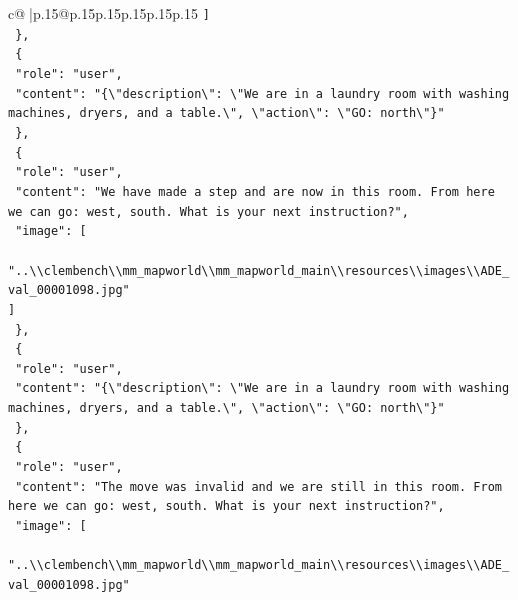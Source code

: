 \documentclass{article}
\begin{document}
{\begin{supertabular}{c@{$\;$}|p{.15\linewidth}@{}p{.15\linewidth}p{.15\linewidth}p{.15\linewidth}p{.15\linewidth}p{.15\linewidth}}
{{{\texttt{    {]}} \\
\texttt{  \},} \\
\texttt{  \{} \\
\texttt{    "role": "user",} \\
\texttt{    "content": "\{\textbackslash{}"description\textbackslash{}": \textbackslash{}"We are in a laundry room with washing machines, dryers, and a table.\textbackslash{}", \textbackslash{}"action\textbackslash{}": \textbackslash{}"GO: north\textbackslash{}"\}"} \\
\texttt{  \},} \\
\texttt{  \{} \\
\texttt{    "role": "user",} \\
\texttt{    "content": "We have made a step and are now in this room. From here we can go: west, south. What is your next instruction?",} \\
\texttt{    "image": {[}} \\
\texttt{      "..\textbackslash{}\textbackslash{}clembench\textbackslash{}\textbackslash{}mm\_mapworld\textbackslash{}\textbackslash{}mm\_mapworld\_main\textbackslash{}\textbackslash{}resources\textbackslash{}\textbackslash{}images\textbackslash{}\textbackslash{}ADE\_val\_00001098.jpg"} \\
\texttt{    {]}} \\
\texttt{  \},} \\
\texttt{  \{} \\
\texttt{    "role": "user",} \\
\texttt{    "content": "\{\textbackslash{}"description\textbackslash{}": \textbackslash{}"We are in a laundry room with washing machines, dryers, and a table.\textbackslash{}", \textbackslash{}"action\textbackslash{}": \textbackslash{}"GO: north\textbackslash{}"\}"} \\
\texttt{  \},} \\
\texttt{  \{} \\
\texttt{    "role": "user",} \\
\texttt{    "content": "The move was invalid and we are still in this room. From here we can go: west, south. What is your next instruction?",} \\
\texttt{    "image": {[}} \\
\texttt{      "..\textbackslash{}\textbackslash{}clembench\textbackslash{}\textbackslash{}mm\_mapworld\textbackslash{}\textbackslash{}mm\_mapworld\_main\textbackslash{}\textbackslash{}resources\textbackslash{}\textbackslash{}images\textbackslash{}\textbackslash{}ADE\_val\_00001098.jpg"} \\
}}}
\end{supertabular}}
\end{document}
